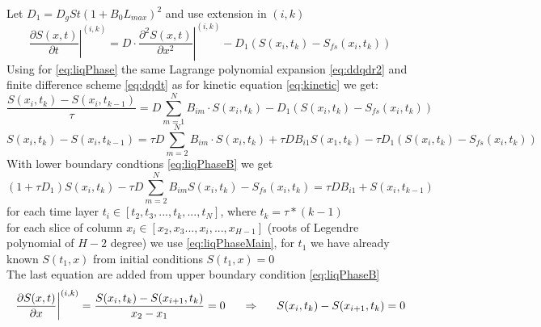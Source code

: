 \documentclass[12pt]{article}
\begin{document}
Let $D_1=D_gSt(1+B_0L_{max})^2$ and use extension in $(i, k)$
\begin{equation}\label{eq:liqPhase}
\left.\dfrac{\partial S(x,t)}{\partial t}\right|^{(i, k)}=
D \cdot \left.\dfrac{\partial^2 S(x,t)}{\partial x^2}\right|^{(i, k)}-D_1(S(x_i,t_k)-S_{fs}(x_i,t_k))
\end{equation}
Using for \eqref{eq:liqPhase} the same Lagrange polynomial expansion \eqref{eq:ddqdr2} and finite difference scheme \eqref{eq:dqdt} as for kinetic equation  \eqref{eq:kinetic} we get:
\begin{equation}\label{eq:liqPhase1}
\dfrac{S(x_i,t_k) - S(x_i,t_{k-1})}{\tau}=
D\sum_{m=1}^NB_{im}\cdot  S(x_i, t_k) - D_1(S(x_i,t_k)-S_{fs}(x_i,t_k))
\end{equation}
\begin{equation}\label{eq:liqPhase2}
S(x_i,t_k) - S(x_i,t_{k-1})=
\tau D\sum_{m=2}^NB_{im}\cdot S(x_i, t_k) +  \tau D B_{i1}S(x_1, t_k) -  \tau D_1(S(x_i,t_k)-S_{fs}(x_i,t_k))
\end{equation}
With lower boundary condtions \eqref{eq:liqPhaseB} we get
\begin{equation}\label{eq:liqPhaseMain}
(1  + \tau D_1)S(x_i,t_k) - \tau D\sum_{m=2}^NB_{im}S(x_i,t_k) - S_{fs}(x_i,t_k)  =
\tau D B_{i1} + S(x_i,t_{k-1}) 
\end{equation}
for each time layer $t_i \in [t_2, t_3, ..., t_k, ..., t_N]$, where $t_k=\tau*(k-1)$ \\
for each slice of column $x_i \in [x_2, x_3 ..., x_i, ..., x_{H-1}]$ (roots of Legendre polynomial of $H-2$ degree) we use \eqref{eq:liqPhaseMain}, for $t_1$ we have already known $S(t_1, x)$ from initial conditions $S(t_1, x) = 0$\\
The last equation are added from upper boundary condition \eqref{eq:liqPhaseB}
\begin{equation}
\left.\dfrac{\partial S(x,t)}{\partial x}\right\vert^{(i, k)}=
\dfrac{S(x_i, t_k) - S(x_{i+1}, t_k)}{x_2-x_1}=0 \indent\Rightarrow\indent S(x_i, t_k) - S(x_{i+1}, t_k)=0
\end{equation}\\
\end{document}
